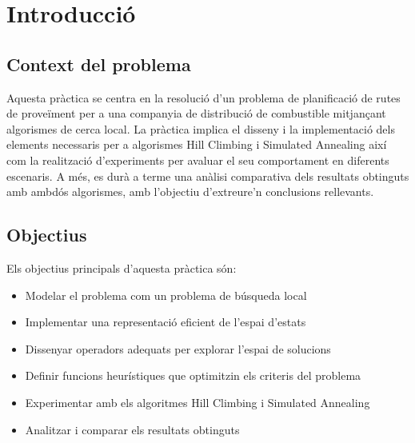 \section{Introducció}
\label{sec:introduction}

\vspace{0.5cm}

\subsection{Context del problema }
Aquesta pràctica se centra en la resolució d'un problema de planificació de rutes de proveïment per a una companyia de distribució de combustible mitjançant algorismes de cerca local. La pràctica implica el disseny i la implementació dels elements necessaris per a algorismes Hill Climbing i Simulated Annealing així com la realització d’experiments per avaluar el seu comportament en diferents escenaris. A més, es durà a terme una anàlisi comparativa dels resultats obtinguts amb ambdós algorismes, amb l’objectiu d’extreure’n conclusions rellevants.

\vspace{0.5cm}

\subsection{Objectius}
Els objectius principals d'aquesta pràctica són:

\begin{itemize}
    \item Modelar el problema com un problema de búsqueda local
    \item Implementar una representació eficient de l'espai d'estats
    \item Dissenyar operadors adequats per explorar l'espai de solucions
    \item Definir funcions heurístiques que optimitzin els criteris del problema
    \item Experimentar amb els algoritmes Hill Climbing i Simulated Annealing
    \item Analitzar i comparar els resultats obtinguts
\end{itemize}
